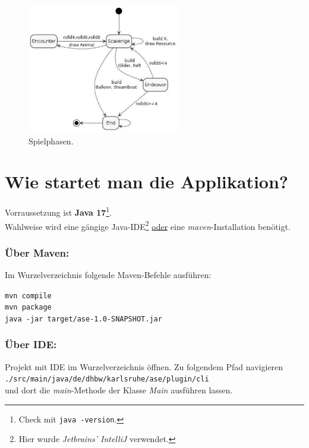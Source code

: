 \begin{figure}
	\centering
	\includegraphics[width=0.6\textwidth]{Bilder/game-phases.png} 
	\caption{Spielphasen.}
	\label{fig:phases}
\end{figure} 

\section{Wie startet man die Applikation?}

Vorraussetzung ist \textbf{Java 17}\footnote{Check mit \texttt{java -version}.}. \\ 
Wahlweise wird eine gängige Java-IDE\footnote{Hier wurde \textit{Jetbrains' IntelliJ} verwendet.} 
\underline{oder} eine \textit{maven}-Installation benötigt.

\subsubsection{Über Maven:} 

Im Wurzelverzeichnis folgende Maven-Befehle ausführen:

\texttt{mvn compile} \\
\texttt{mvn package} \\ 
\texttt{java -jar target/ase-1.0-SNAPSHOT.jar} \\ 
 

\subsubsection{Über IDE:}

Projekt mit IDE im Wurzelverzeichnis öffnen. 
Zu folgendem Pfad navigieren \\ 
\texttt{./src/main/java/de/dhbw/karlsruhe/ase/plugin/cli} \\
und dort die \textit{main}-Methode der Klasse \textit{Main} ausführen lassen.

